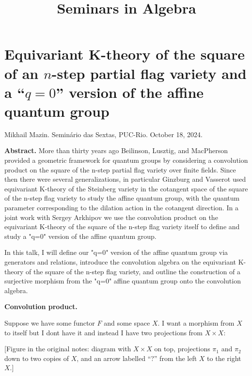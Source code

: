 



\title{Seminars in Algebra}
\maketitle

\label{section-phantom}

\tableofcontents

\section{Equivariant K-theory of the square
of an $n$-step partial flag variety and a
``$q=0$'' version of the affine quantum
group}
\label{section-mazin-k-theory}

\noindent
Mikhail Mazin.
Semin\'ario das Sextas, PUC-Rio.
October 18, 2024.

\medskip\noindent
{\bf Abstract.}
More than thirty years ago Beilinson,
Lusztig, and MacPherson provided a geometric
framework for quantum groups by considering a
convolution product on the square of the
n-step partial flag variety over finite
fields. Since then there were several
generalizations, in particular Ginzburg and
Vasserot used equivariant K-theory of the
Steinberg variety in the cotangent space of
the square of the n-step flag variety to
study the affine quantum group, with the
quantum parameter corresponding to the
dilation action in the cotangent direction.
In a joint work with Sergey Arkhipov we use
the convolution product on the equivariant
K-theory of the square of the n-step flag
variety itself to define and study a "q=0"
version of the affine quantum group.

In this talk, I will define our "q=0" version
of the affine quantum group via generators
and relations, introduce the convolution
algebra on the equivariant K-theory of the
square of the n-step flag variety, and
outline the construction of a surjective
morphism from the "q=0" affine quantum group
onto the convolution algebra.

\bigskip\noindent
{\bf Convolution product.}

\medskip{}
Suppose we have some functor $F$ and some
space  $X$. I want a morphism from $X$ to
itself but I dont have it and instead I have
two projections from $X \times  X$:

[Figure in the original notes: diagram with
$X\times X$ on top, projections $\pi_1$ and
$\pi_2$ down to two copies of $X$, and an
arrow labelled ``?'' from the left $X$ to the
right $X$.]

